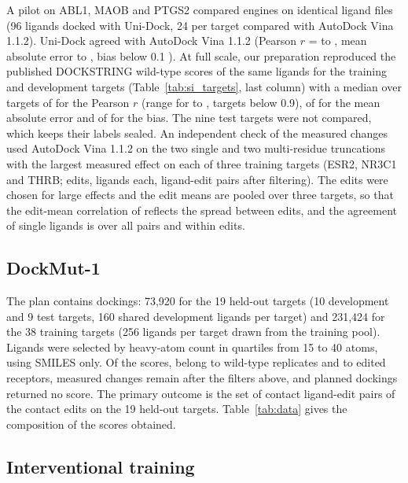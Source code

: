 A pilot on ABL1, MAOB and PTGS2 compared engines on identical ligand files (96 ligands docked with Uni-Dock, 24 per target compared with AutoDock Vina 1.1.2). Uni-Dock agreed with AutoDock Vina 1.1.2 (Pearson $r$ = \pilotRLo{} to \pilotRHi{}, mean absolute error \pilotMaeLo{} to \pilotMaeHi{} \kcal{}, bias below 0.1 \kcal{}). At full scale, our preparation reproduced the published DOCKSTRING wild-type scores of the same ligands for the \nParity{} training and development targets (Table~\ref{tab:si_targets}, last column) with a median over targets of \parityR{} for the Pearson $r$ (range \parityRMin{} for \parityRMinTarget{} to \parityRMax{}, \nParityBelow{} targets below 0.9), of \parityMae{} \kcal{} for the mean absolute error and of \parityBias{} \kcal{} for the bias. The nine test targets were not compared, which keeps their labels sealed. An independent check of the measured changes used AutoDock Vina 1.1.2 on the two single and two multi-residue truncations with the largest measured effect on each of three training targets (ESR2, NR3C1 and THRB; \vinaEdits{} edits, \vinaLigPerEdit{} ligands each, \vinaN{} ligand-edit pairs after filtering). The edits were chosen for large effects and the edit means are pooled over three targets, so that the edit-mean correlation of \vinaEditR{} reflects the spread between edits, and the agreement of single ligands is \vinaR{} over all pairs and \vinaWithinR{} within edits.

\subsection{DockMut-1}

The plan contains \nPlanned{} dockings: 73,920 for the 19 held-out targets (10 development and 9 test targets, 160 shared development ligands per target) and 231,424 for the 38 training targets (256 ligands per target drawn from the training pool). Ligands were selected by heavy-atom count in quartiles from 15 to 40 atoms, using SMILES only. Of the \nDock{} scores, \nScoresWt{} belong to wild-type replicates and \nScoresChange{} to edited receptors, \nChangesKept{} measured changes remain after the filters above, and \nNoScore{} planned dockings returned no score. The primary outcome is the set of \nPrimaryPairs{} contact ligand-edit pairs of the \nPrimaryEdits{} contact edits on the 19 held-out targets. Table~\ref{tab:data} gives the composition of the scores obtained.



\subsection{Interventional training}

